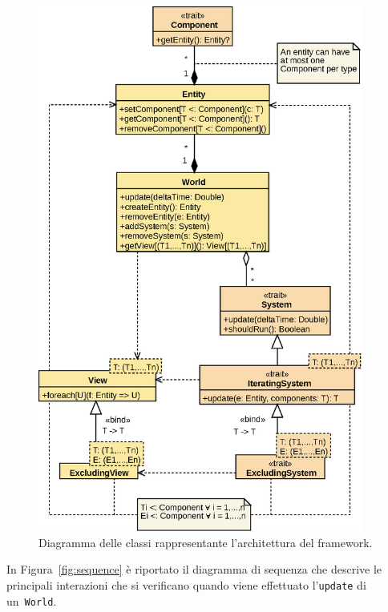 \begin{figure}[H]
    \centering
    \includegraphics[width=0.95\textwidth]{./img/Architechture}
    \caption{Diagramma delle classi rappresentante l'architettura del framework.}\label{fig:architecture}
\end{figure}

In Figura~\ref{fig:sequence} è riportato il diagramma di sequenza che descrive le principali interazioni che si
verificano quando viene effettuato l'\texttt{update} di un~\texttt{World}.


